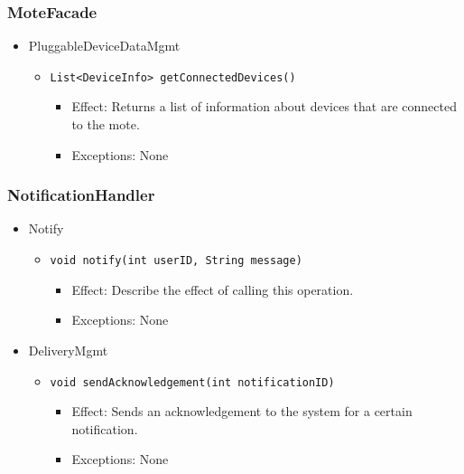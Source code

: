     \subsubsection{MoteFacade}\label{add1-int-motefacade}
        \begin{itemize}
            \item PluggableDeviceDataMgmt
            \begin{itemize}
                \item \texttt{List<DeviceInfo> getConnectedDevices()}
                \begin{itemize}
                    \item Effect: Returns a list of information about devices that are connected to the mote.
                    \item Exceptions: None
                \end{itemize}
            \end{itemize}
        \end{itemize}

    \subsubsection{NotificationHandler}
        \begin{itemize}
            \item Notify
            \begin{itemize}
                \item \texttt{void notify(int userID, String message)}
                \begin{itemize}
                    \item Effect: Describe the effect of calling this operation.
                    \item Exceptions: None
                \end{itemize}
            \end{itemize}

            \item DeliveryMgmt
            \begin{itemize}
                \item \texttt{void sendAcknowledgement(int notificationID)}
                \begin{itemize}
                    \item Effect: Sends an acknowledgement to the system for a certain notification.
                    \item Exceptions: None
                \end{itemize}
            \end{itemize}
        \end{itemize}

